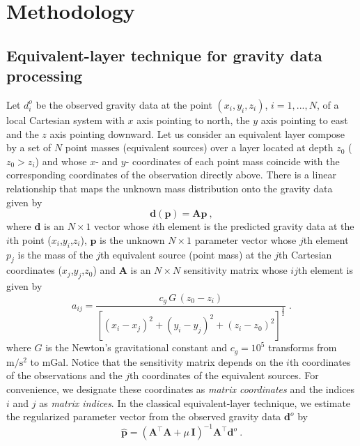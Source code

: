 \documentclass[manuscript,revised]{geophysics}
\begin{document}
\section*{Methodology}

\subsection{Equivalent-layer technique for gravity data processing}

Let $d^{o}_{i}$ be the observed gravity data at
the point $(x_{i}, y_{i}, z_{i})$, $i = 1, ..., N$, of a local Cartesian
system with $x$ axis pointing to north, the $y$ axis pointing to east and 
the $z$ axis pointing downward.
Let us consider an equivalent layer compose by a set of $N$ point masses 
(equivalent sources) over a layer located at depth $z_0$ ($z_0 >z_i$) and whose 
$x$- and $y$- coordinates of each point mass coincide with the corresponding coordinates 
of the observation directly above.
There is a linear relationship that maps the unknown mass distribution onto the gravity 
data given by
\begin{equation}
\mathbf{d}(\mathbf{p}) = \mathbf{A} \mathbf{p} \: ,
\label{eq:predicted-data-vector}
\end{equation}
where $\mathbf{d}$ is an $N \times 1$ vector whose $i$th element is the predicted gravity 
data at the $i$th point ($x_i$,$y_i$,$z_i$), $\mathbf{p}$ is the unknown $N \times 1$ 
parameter vector whose $j$th element $p_j$  is the mass of the $j$th equivalent source 
(point mass) at the $j$th Cartesian coordinates ($x_j$,$y_j$,$z_0$) and $\mathbf{A}$ 
is an $N \times N$  sensitivity matrix whose $ij$th element is given by 
\begin{equation}
a_{ij}= \frac{c_{g} \, G \, (z_{0} - z_{i})}{\left[(x_{i} - x_{j})^{2} +
(y_{i} - y_{j})^{2} +	(z_{i} - z_{0})^{2} \right]^{\frac{3}{2}}} \; .
\label{eq:aij}
\end{equation}
where $G$ is the Newton's gravitational constant and $c_{g} = 10^{5}$ 
transforms from $\mathrm{m/s^2}$ to mGal.
Notice that the sensitivity matrix depends on the $i$th coordinates of the observations 
and the $j$th coordinates of the equivalent sources. For convenience, we designate 
these coordinates as \textit{matrix coordinates} and the indices $i$ and $j$ as 
\textit{matrix indices}.
In the classical equivalent-layer technique, we estimate the regularized parameter vector 
from the observed gravity data $\mathbf{d}^{o}$ by
\begin{equation}
\hat{\mathbf{p}} = \left( \mathbf{A}^{\top}\mathbf{A} + 
\mu \, \mathbf{I} \right)^{-1}
\mathbf{A}^{\top} \mathbf{d}^{o} \: .
\label{eq:estimated-p-parameter-space}
\end{equation}
\end{document}

